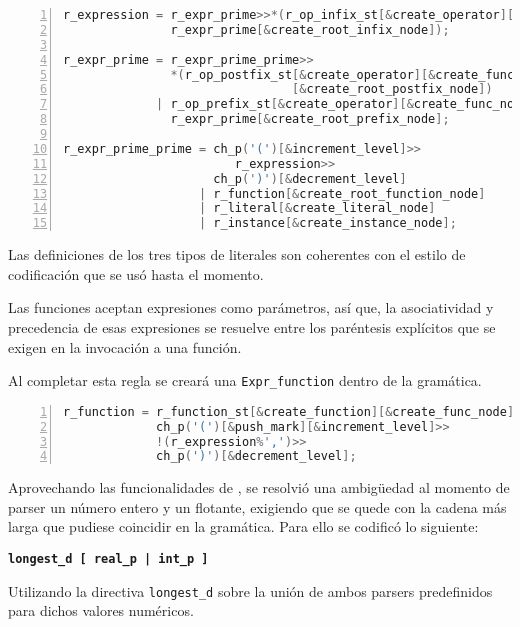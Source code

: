 \begin{lstlisting}[language=C++, basicstyle=\scriptsize, numbers=left, numbersep=5pt, numberstyle=\tiny]
r_expression = r_expr_prime>>*(r_op_infix_st[&create_operator][&create_func_node]>>
               r_expr_prime[&create_root_infix_node]);

r_expr_prime = r_expr_prime_prime>>
               *(r_op_postfix_st[&create_operator][&create_func_node]
                                [&create_root_postfix_node])
             | r_op_prefix_st[&create_operator][&create_func_node]>>
               r_expr_prime[&create_root_prefix_node];

r_expr_prime_prime = ch_p('(')[&increment_level]>>
                        r_expression>>
                     ch_p(')')[&decrement_level]
                   | r_function[&create_root_function_node]
                   | r_literal[&create_literal_node]
                   | r_instance[&create_instance_node];
\end{lstlisting}

Las definiciones de los tres tipos de literales son coherentes con el estilo de codificación que se usó hasta el momento.

Las funciones aceptan expresiones como parámetros, así que, la asociatividad y precedencia de esas expresiones se resuelve entre los paréntesis explícitos que se exigen en la invocación a una función.

Al completar esta regla se creará una \texttt{Expr\_function} dentro de la gramática.

\begin{lstlisting}[language=C++, basicstyle=\scriptsize, numbers=left, numbersep=5pt, numberstyle=\tiny]
r_function = r_function_st[&create_function][&create_func_node]>>
             ch_p('(')[&push_mark][&increment_level]>>
             !(r_expression%',')>>
             ch_p(')')[&decrement_level];
\end{lstlisting}

Aprovechando las funcionalidades de \spirit, se resolvió una ambigüedad al momento de parser un número entero y un flotante, exigiendo que se quede con la cadena más larga que pudiese coincidir en la gramática. Para ello se codificó lo siguiente:

\begin{center}\textbf{\large{\texttt{longest\_d\ [\ real\_p\ |\ int\_p\ ]}}}\end{center}

Utilizando la directiva \texttt{longest\_d} sobre la unión de ambos parsers predefinidos para dichos valores numéricos.

